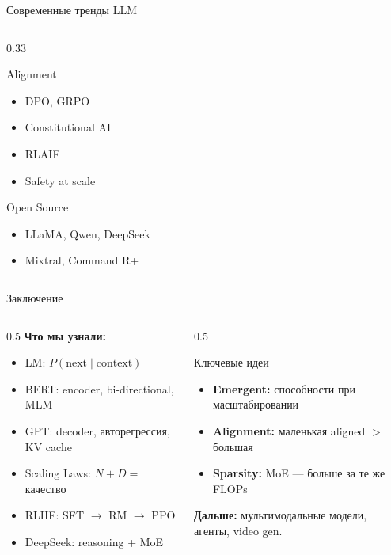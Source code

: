 \documentclass[aspectratio=169, 8pt]{beamer}
\begin{document}
\begin{frame}{Современные тренды LLM}
\begin{columns}[T]
\begin{column}{0.33\textwidth}
      \begin{block}{Alignment}
        \begin{itemize}\small
          \item DPO, GRPO
          \item Constitutional AI
          \item RLAIF
          \item Safety at scale
        \end{itemize}
      \end{block}
      \begin{block}{Open Source}
        \begin{itemize}\small
          \item LLaMA, Qwen, DeepSeek
          \item Mixtral, Command R+
        \end{itemize}
      \end{block}
    \end{column}
  \end{columns}
\end{frame}

\begin{frame}{Заключение}
  \begin{columns}[T]
    \begin{column}{0.5\textwidth}
      \textbf{Что мы узнали:}
      \begin{itemize}\small
        \item LM: $P(\text{next} \mid \text{context})$
        \item BERT: encoder, bi-directional, MLM
        \item GPT: decoder, авторегрессия, KV cache
        \item Scaling Laws: $N + D =$ качество
        \item RLHF: SFT $\to$ RM $\to$ PPO
        \item DeepSeek: reasoning + MoE
      \end{itemize}
    \end{column}
    \begin{column}{0.5\textwidth}
      \begin{block}{Ключевые идеи}
        \begin{itemize}\small
          \item \textbf{Emergent:} способности при масштабировании
          \item \textbf{Alignment:} маленькая aligned $>$ большая
          \item \textbf{Sparsity:} MoE --- больше за те же FLOPs
        \end{itemize}
      \end{block}
      \textbf{Дальше:} мультимодальные модели, агенты, video gen.
    \end{column}
  \end{columns}
\end{frame}
\end{document}

